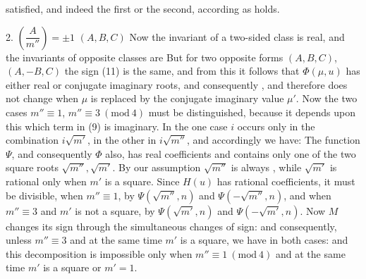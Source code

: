 satisfied, and indeed the first or the second, according as
holds.

2.  $\left(\dfrac{A}{m''}\right)=\pm 1$  $(A,B,C)$
Now the invariant of a two-sided class is real, and the invariants of opposite classes are  But for two opposite forms $(A,B,C)$, $(A,-B,C)$ the sign (11) is the same, and from this it follows that $\Phi(\mu,u)$ has either real or conjugate imaginary roots, and consequently , and therefore does not change when $\mu$ is replaced by the conjugate imaginary value $\mu'$. Now the two cases $m''\equiv 1$, $m''\equiv 3 \ (\mathrm{mod}\ 4)$ must be distinguished, because it depends upon this which term in (9) is imaginary. In the one case $i$ occurs only in the combination $i\sqrt{m'}$, in the other in $i\sqrt{m''}$, and accordingly we have:
The function $\Psi$, and consequently $\Phi$ also, has real coefficients and contains only one of the two square roots $\sqrt{m''}, \sqrt{m'}$. By our assumption $\sqrt{m''}$ is always , while $\sqrt{m'}$ is rational only when $m'$ is a square. Since $H(u)$ has rational coefficients, it must be divisible, when $m''\equiv 1$, by $\Psi(\sqrt{m''},n)$ and $\Psi(-\sqrt{m''},n)$, and when $m''\equiv 3$ and $m'$ is not a square, by $\Psi(\sqrt{m'},n)$ and $\Psi(-\sqrt{m'},n)$.
Now $M$ changes its sign through the simultaneous changes of sign:
and consequently, unless $m''\equiv 3$ and at the same time $m'$ is a square, we have in both cases:
and this decomposition is impossible only when $m''\equiv 1 \ (\mathrm{mod}\ 4)$ and at the same time $m'$ is a square or $m'=1$.
